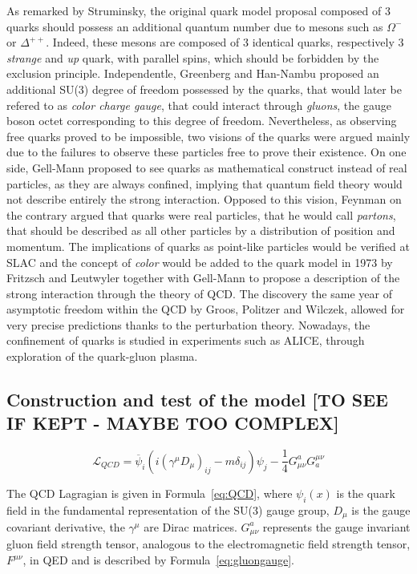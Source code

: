 	As remarked by Struminsky, the original quark model proposal composed of 3 quarks should possess an additional quantum number due to mesons such as $\Omega^-$ or $\Delta^{++}$. Indeed, these mesons are composed of 3 identical quarks, respectively 3 \textit{strange} and \textit{up} quark, with parallel spins, which should be forbidden by the exclusion principle. Independentle, Greenberg and Han-Nambu proposed an additional SU(3) degree of freedom possessed by the quarks, that would later be refered to as \textit{color charge gauge}, that could interact through \textit{gluons}, the gauge boson octet corresponding to this degree of freedom. Nevertheless, as observing free quarks proved to be impossible, two visions of the quarks were argued mainly due to the failures to observe these particles free to prove their existence. On one side, Gell-Mann proposed to see quarks as mathematical construct instead of real particles, as they are always confined, implying that quantum field theory would not describe entirely the strong interaction. Opposed to this vision, Feynman on the contrary argued that quarks were real particles, that he would call \textit{partons}, that should be described as all other particles by a distribution of position and momentum. The implications of quarks as point-like particles would be verified at SLAC and the concept of \textit{color} would be added to the quark model in 1973 by Fritzsch and Leutwyler together with Gell-Mann to propose a description of the strong interaction through the theory of \acf{QCD}. The discovery the same year of asymptotic freedom within the QCD by Groos, Politzer and Wilczek, allowed for very precise predictions thanks to the perturbation theory. Nowadays, the confinement of quarks is studied in experiments such as ALICE, through exploration of the quark-gluon plasma.
	
	\subsection{Construction and test of the model [TO SEE IF KEPT - MAYBE TOO COMPLEX]}
	\label{chapt2:ssec:model}
	
	\begin{equation}
		\label{eq:QCD}
		\mathcal{L}_{QCD} = \overline{\psi}_i(i(\gamma^\mu D_\mu)_{ij} - m\delta_{ij})\psi_j - \frac{1}{4}G^a_{\mu\nu}G^{\mu\nu}_a
	\end{equation}
	
	 The QCD Lagragian is given in Formula~\ref{eq:QCD}, where $\psi_i(x)$ is the quark field in the fundamental representation of the SU(3) gauge group, $D_\mu$ is the gauge covariant derivative, the $\gamma^\mu$ are Dirac matrices. $G^a_{\mu\nu}$ represents the gauge invariant gluon field strength tensor, analogous to the electromagnetic field strength tensor, $F^{\mu\nu}$, in QED and is described by Formula~\ref{eq:gluongauge}.
	
